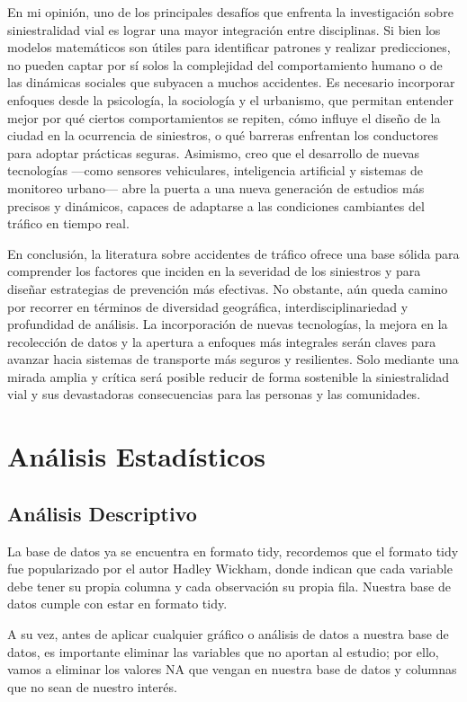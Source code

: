 \documentclass{book}
\begin{document}
En mi opinión, uno de los principales desafíos que enfrenta la investigación sobre siniestralidad vial es lograr una mayor integración entre disciplinas. Si bien los modelos matemáticos son útiles para identificar patrones y realizar predicciones, no pueden captar por sí solos la complejidad del comportamiento humano o de las dinámicas sociales que subyacen a muchos accidentes. Es necesario incorporar enfoques desde la psicología, la sociología y el urbanismo, que permitan entender mejor por qué ciertos comportamientos se repiten, cómo influye el diseño de la ciudad en la ocurrencia de siniestros, o qué barreras enfrentan los conductores para adoptar prácticas seguras. Asimismo, creo que el desarrollo de nuevas tecnologías ---como sensores vehiculares, inteligencia artificial y sistemas de monitoreo urbano--- abre la puerta a una nueva generación de estudios más precisos y dinámicos, capaces de adaptarse a las condiciones cambiantes del tráfico en tiempo real.

En conclusión, la literatura sobre accidentes de tráfico ofrece una base sólida para comprender los factores que inciden en la severidad de los siniestros y para diseñar estrategias de prevención más efectivas. No obstante, aún queda camino por recorrer en términos de diversidad geográfica, interdisciplinariedad y profundidad de análisis. La incorporación de nuevas tecnologías, la mejora en la recolección de datos y la apertura a enfoques más integrales serán claves para avanzar hacia sistemas de transporte más seguros y resilientes. Solo mediante una mirada amplia y crítica será posible reducir de forma sostenible la siniestralidad vial y sus devastadoras consecuencias para las personas y las comunidades.

\section{Análisis Estadísticos}

\subsection{Análisis Descriptivo}

La base de datos ya se encuentra en formato tidy, recordemos que el formato tidy fue popularizado por el autor Hadley Wickham, donde indican que cada variable debe tener su propia columna y cada observación su propia fila. Nuestra base de datos cumple con estar en formato tidy.

A su vez, antes de aplicar cualquier gráfico o análisis de datos a nuestra base de datos, es importante eliminar las variables que no aportan al estudio; por ello, vamos a eliminar los valores NA que vengan en nuestra base de datos y columnas que no sean de nuestro interés.
\end{document}
